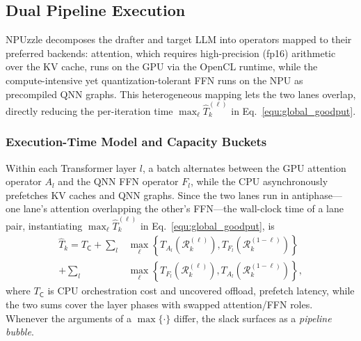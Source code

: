 \documentclass[sigconf,nonacm,10pt]{acmart}
\newcommand{\name}{NPUzzle\xspace}
\begin{document}
\subsection{Dual Pipeline Execution}  \label{sec:pipeline_execution}
\name decomposes the drafter and target LLM into operators mapped to their preferred backends: attention, which requires high-precision {\color{red}(fp16)} arithmetic over the KV cache, runs on the GPU via the OpenCL runtime, while the compute-intensive yet quantization-tolerant FFN runs on the NPU as precompiled QNN graphs. {\color{red}This heterogeneous mapping lets the two lanes overlap, directly reducing the per-iteration time $\max_\ell\widehat T_k^{(\ell)}$ in Eq.~\eqref{equ:global_goodput}.}

\subsubsection{Execution-Time Model and Capacity Buckets} \label{sec:execution_lane}
Within each Transformer layer $l$, a batch alternates between the GPU attention operator $A_l$ and the QNN FFN operator $F_l$, while the CPU asynchronously prefetches KV caches and QNN graphs. Since the two lanes run in antiphase---one lane's attention overlapping the other's FFN---the wall-clock time of a lane pair, instantiating $\max_\ell\widehat T_k^{(\ell)}$ in Eq.~\eqref{equ:global_goodput}, is
\begin{equation}
\begin{aligned}
\widehat T_k =
T_{\mathsf C} +
\sum_{l} & \max_{\ell}\!\left\{T_{A_l}\!\left(\mathcal R^{(\ell)}_k\right), T_{F_l}\!\left(\mathcal R^{(1-\ell)}_k\right)\right\} \\ +
\sum_{l} & \max_{\ell}\!\left\{T_{F_l}\!\left(\mathcal R^{(\ell)}_k\right), T_{A_l}\!\left(\mathcal R^{(1-\ell)}_k\right)\right\},
\end{aligned}
\label{equ:duallane_round}
\end{equation}
where $T_{\mathsf C}$ is CPU orchestration cost and uncovered offload, prefetch latency, while the two sums cover the layer phases with swapped attention/FFN roles. Whenever the arguments of a $\max\{\cdot\}$ differ, the slack surfaces as a \emph{pipeline bubble}.
\end{document}
